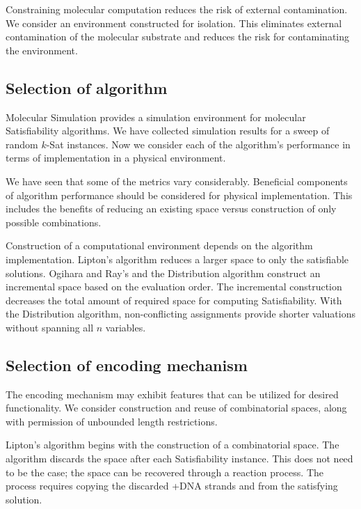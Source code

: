   Constraining molecular computation reduces the risk of external contamination.  We consider an environment constructed for isolation.  This eliminates external contamination of the molecular substrate and reduces the risk for contaminating the environment.

			
		\subsection{Selection of algorithm}
		
Molecular Simulation provides a simulation environment for molecular {\sc Satisfiability} algorithms.  We have collected simulation results for a sweep of random $k$-{\sc Sat} instances.  Now we consider each of the algorithm's performance in terms of implementation in a physical environment.
			
We have seen that some of the metrics vary considerably.  Beneficial components of algorithm performance should be considered for physical implementation.  This includes the benefits of reducing an existing space versus construction of only possible combinations.
		
Construction of a computational environment depends on the algorithm implementation.  Lipton's algorithm reduces a larger space to only the satisfiable solutions.  Ogihara and Ray's and the Distribution algorithm construct an incremental space based on the evaluation order.  The incremental construction decreases the total amount of required space for computing {\sc Satisfiability}.  With the Distribution algorithm, non-conflicting assignments provide shorter valuations without spanning all $n$ variables.
			
		\subsection{Selection of encoding mechanism}
		
The encoding mechanism may exhibit features that can be utilized for desired functionality.  We consider construction and reuse of combinatorial spaces, along with permission of unbounded length restrictions.

Lipton's algorithm begins with the construction of a combinatorial space. The algorithm discards the space after each {\sc Satisfiability} instance.  This does not need to be the case; the space can be recovered through a reaction process.  The process requires copying the discarded +DNA strands and from the satisfying solution.
			
